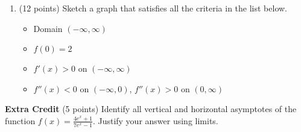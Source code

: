 \documentclass[12pt]{article}
\begin{document}
\begin{enumerate}
\vspace{1in}

\newpage
\item (12 points) Sketch a graph that satisfies all the criteria in the list below.\\

\begin{multicols}{2}
\begin{itemize}
\item Domain $(-\infty, \infty)$
\item $f(0)=2$
\item $f'(x) > 0$ on $(-\infty, \infty)$
\item $f''(x) < 0$ on $(-\infty, 0)$, $f''(x) > 0$ on $(0,\infty)$
\end{itemize}

\quad

\vspace{.3in}

\quad
 \columnbreak
 
\end{multicols}
\end{enumerate}



\textbf{Extra Credit} (5 points) Identify all vertical and horizontal asymptotes of the function $f(x)=\frac{4e^x+1}{7e^x-1}$. Justify your answer using limits.
\vfill
\end{document}
